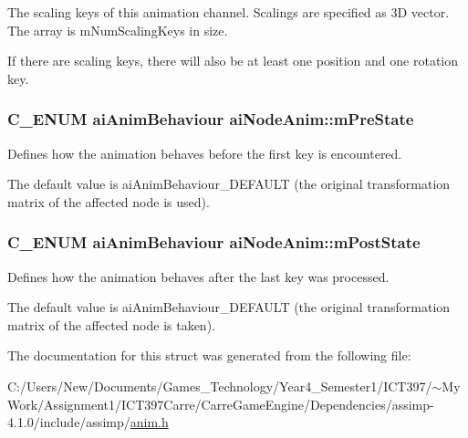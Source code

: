 The scaling keys of this animation channel. Scalings are specified as 3D vector. The array is mNumScalingKeys in size.

If there are scaling keys, there will also be at least one position and one rotation key. \hypertarget{structai_node_anim_305c01b60886a07b69f04b1db6d7d3c5}{
\subsubsection[mPreState]{\setlength{\rightskip}{0pt plus 5cm}C\_\-ENUM {\bf aiAnimBehaviour} {\bf aiNodeAnim::mPreState}}}
\label{structai_node_anim_305c01b60886a07b69f04b1db6d7d3c5}


Defines how the animation behaves before the first key is encountered.

The default value is aiAnimBehaviour\_\-DEFAULT (the original transformation matrix of the affected node is used). \hypertarget{structai_node_anim_93cefd440cbaf587c136eb224d4a0327}{
\subsubsection[mPostState]{\setlength{\rightskip}{0pt plus 5cm}C\_\-ENUM {\bf aiAnimBehaviour} {\bf aiNodeAnim::mPostState}}}
\label{structai_node_anim_93cefd440cbaf587c136eb224d4a0327}


Defines how the animation behaves after the last key was processed.

The default value is aiAnimBehaviour\_\-DEFAULT (the original transformation matrix of the affected node is taken). 

The documentation for this struct was generated from the following file:\begin{CompactItemize}
\item 
C:/Users/New/Documents/Games\_\-Technology/Year4\_\-Semester1/ICT397/$\sim$My Work/Assignment1/ICT397Carre/CarreGameEngine/Dependencies/assimp-4.1.0/include/assimp/\hyperlink{anim_8h}{anim.h}\end{CompactItemize}
